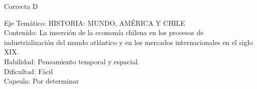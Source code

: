 \documentclass[letterpaper,11pt]{article}
\newcommand{\anchopregunta}{0.9\textwidth}
\begin{document}
\begin{enumerate}
\begin{minipage}{\anchopregunta}
\begin{hint}
\end{hint}
\begin{answer} Correcta D \\
\end{answer}
\begin{info} %
\begin{flushleft}
Eje Temático: HISTORIA: MUNDO, AMÉRICA Y CHILE\\
Contenido: La inserción de la economía chilena en los procesos de industrialización del mundo atlántico y en los mercados internacionales en el siglo XIX.\\
Habilidad: Pensamiento temporal y espacial.\\
Dificultad: Fácil\\
Capsula: Por determinar \\
\end{flushleft} 
\end{info}
\end{minipage}\vfill$\;$ %


\end{enumerate}
\end{document}
